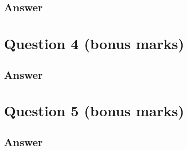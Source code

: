 \documentclass[
	12pt, %
]{fphw}
\begin{document}

\subsection*{Answer} 




\section*{Question 4 (bonus marks)}

\begin{problem}

\end{problem}


\subsection*{Answer}




\section*{Question 5 (bonus marks)}

\begin{problem}

\end{problem}


\subsection*{Answer}

\begin{enumerate}

\end{enumerate}

\end{document}
